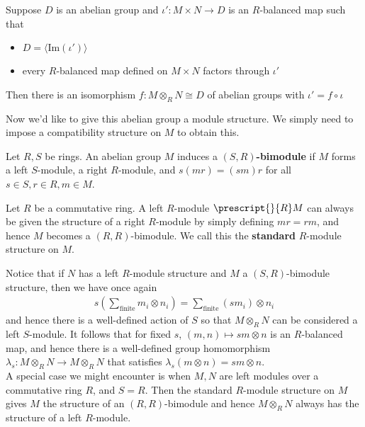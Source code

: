 \documentclass{memoir}
\begin{document}
\begin{cor}
	Suppose \(D\) is an abelian group and \(\iota':M \times N \to D\) is an \(R\)-balanced map such that
	\begin{itemize}
		\item \(D = \langle \textrm{Im}(\iota')\rangle \) 
		\item every \(R\)-balanced map defined on \(M\times N\) factors through \(\iota'\)
	\end{itemize}
	Then there is an isomorphism \(f: M \otimes_R N \cong D\) of abelian groups with \(\iota' = f \circ \iota\)
\end{cor}

Now we'd like to give this abelian group a module structure. We simply need to impose a compatibility structure on \(M\) to obtain this.

\begin{defn}
	Let \(R,S\) be rings. An abelian group \(M\) induces a \textbf{\((S,R)\)-bimodule} if \(M\) forms a left \(S\)-module, a right \(R\)-module, and \(s(mr) = (sm)r\) for all \(s \in S, r \in R, m \in M\).
\end{defn}

\begin{exmp}
	Let \(R\) be a commutative ring. A left \(R\)-module \(\prescript{}{R}M\) can always be given the structure of a right \(R\)-module by simply defining \(mr = rm\), and hence \(M\) becomes a \((R,R)\)-bimodule. We call this the \textbf{standard} \(R\)-module structure on \(M\).
\end{exmp}
Notice that if \(N\) has a left \(R\)-module structure and \(M\) a \((S,R)\)-bimodule structure, then we have once again
\begin{align*}
	s \left( \sum_{\textrm{finite}} m_i \otimes n_i \right) = \sum_{\textrm{finite}} (sm_i) \otimes n_i
\end{align*}
and hence there is a well-defined action of \(S\) so that \(M \otimes_R N\) can be considered a left \(S\)-module. It follows that for fixed \(s\), \((m,n)\mapsto sm \otimes n\) is an \(R\)-balanced map, and hence there is a well-defined group homomorphism \(\lambda_s:M\otimes_R N \to M \otimes_R N\) that satisfies \(\lambda_s(m \otimes n) = sm \otimes n\).\\

A special case we might encounter is when \(M,N\) are left modules over a commutative ring \(R\), and \(S = R\). Then the standard \(R\)-module structure on \(M\) gives \(M\) the structure of an \((R,R)\)-bimodule and hence \(M \otimes_R N\) always has the structure of a left \(R\)-module.
\end{document}
